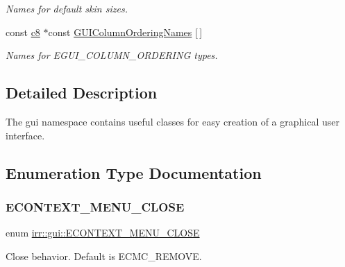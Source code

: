 \begin{DoxyCompactItemize}
\begin{DoxyCompactList}\small\item\em Names for default skin sizes. \end{DoxyCompactList}\item 
\mbox{\label{namespaceirr_1_1gui_ae315f49bae7f44b36f14292a13269673}} 
const \hyperlink{namespaceirr_a9395eaea339bcb546b319e9c96bf7410}{c8} $\ast$const \hyperlink{namespaceirr_1_1gui_ae315f49bae7f44b36f14292a13269673}{G\+U\+I\+Column\+Ordering\+Names} \mbox{[}$\,$\mbox{]}
\begin{DoxyCompactList}\small\item\em Names for E\+G\+U\+I\+\_\+\+C\+O\+L\+U\+M\+N\+\_\+\+O\+R\+D\+E\+R\+I\+NG types. \end{DoxyCompactList}\end{DoxyCompactItemize}


\subsection{Detailed Description}
The gui namespace contains useful classes for easy creation of a graphical user interface. 

\subsection{Enumeration Type Documentation}
\mbox{\label{namespaceirr_1_1gui_a0868ffd1ff3d3fc1e2db2fcd118e320d}} 
\subsubsection{\texorpdfstring{E\+C\+O\+N\+T\+E\+X\+T\+\_\+\+M\+E\+N\+U\+\_\+\+C\+L\+O\+SE}{ECONTEXT\_MENU\_CLOSE}\hspace{0.1cm}{\footnotesize\ttfamily [1/2]}}
{\footnotesize\ttfamily enum \hyperlink{namespaceirr_1_1gui_a0868ffd1ff3d3fc1e2db2fcd118e320d}{irr\+::gui\+::\+E\+C\+O\+N\+T\+E\+X\+T\+\_\+\+M\+E\+N\+U\+\_\+\+C\+L\+O\+SE}}



Close behavior. Default is E\+C\+M\+C\+\_\+\+R\+E\+M\+O\+VE. 

